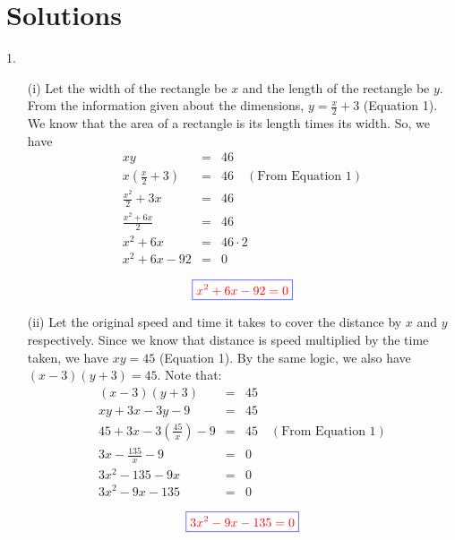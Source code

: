 \documentclass[addpoints, 12pt]{exam}
\theoremstyle{remark}
\begin{document}
\section{Solutions}
1.
\begin{enumerate}
    \item[(i)] Let the width of the rectangle be $x$ and the length of the rectangle be $y$. From the information given about the dimensions, $y=\frac{x}{2} + 3$ (Equation 1). We know that the area of a rectangle is its length times its width. So, we have
    \begin{eqnarray*}
        xy & = & 46 \\
        x\left(\frac{x}{2} + 3\right) & = & 46 \quad (\text{From Equation 1})\\
        \frac{x^2}{2} + 3x & = & 46 \\
        \frac{x^2 + 6x}{2} & = & 46 \\
        x^2 + 6x & = & 46 \cdot 2 \\
        x^2 + 6x - 92 & = & 0 \\
    \end{eqnarray*}
    {\boldmath $$\textcolor{blue}{\boxed{\textcolor{red}{x^2 + 6x - 92 = 0}}}$$}
    \newline
    \newline
    \newline
    \newline
    \newline
    \newline
    \newline
    \newline
    \item[(ii)] Let the original speed and time it takes to cover the distance by $x$ and $y$ respectively. Since we know that distance is speed multiplied by the time taken, we have $xy = 45$ (Equation 1). By the same logic, we also have $(x-3)(y+3) = 45$. Note that:
    \begin{eqnarray*}  
        (x-3)(y+3) & = & 45 \\
        xy+3x-3y-9 & = & 45 \\
        45+3x-3\left(\frac{45}{x}\right) - 9 & = & 45 \quad (\text{From Equation 1})\\
        3x - \frac{135}{x} - 9 & = & 0 \\
        3x^2 - 135 - 9x & = & 0 \\
        3x^2 - 9x - 135 & = & 0 \\
    \end{eqnarray*}
    {\boldmath $$\textcolor{blue}{\boxed{\textcolor{red}{3x^2 - 9x - 135 =  0}}}$$}
\end{enumerate}
\end{document}
